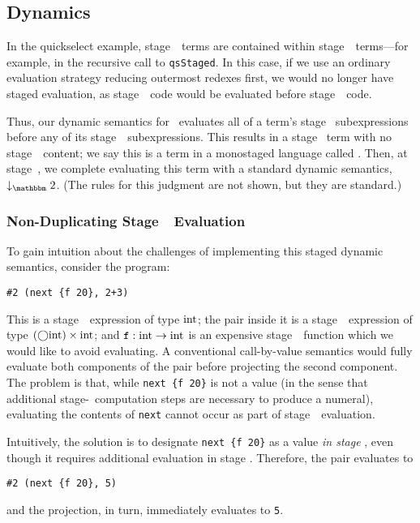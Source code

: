 \subsection{Dynamics}
\label{sec:stagedsemantics}

In the quickselect example, stage~\bbone\ terms are contained within
stage~\bbtwo\ terms---for example, in the recursive call to {\tt qsStaged}. In
this case, if we use an ordinary evaluation strategy reducing outermost redexes
first, we would no longer have staged evaluation, as stage~\bbtwo\ code would
be evaluated before stage~\bbone\ code. 

Thus, our dynamic semantics for \lang\ evaluates all of a term's stage \bbone\
subexpressions before any of its stage~\bbtwo\ subexpressions. This results in
a stage \bbtwo\ term with no stage~\bbone\ content; we say this is a term in a
monostaged language called \langTwo. Then, at stage~\bbtwo, we complete
evaluating this term with a standard dynamic semantics, $\tworedsym$. (The
rules for this judgment are not shown, but they are standard.)

\subsubsection{Non-Duplicating Stage~\bbone\ Evaluation}

To gain intuition about the challenges of implementing this staged dynamic
semantics, consider the program:
\begin{lstlisting}
#2 (next {f 20}, 2+3)
\end{lstlisting}
This is a stage~\bbone\ expression of type ${\rm int}$; the pair inside it is a
stage~\bbone\ expression of type $(\bigcirc{\rm int})\times{\rm int}$; and ${\tt f} :
{\rm int} \to {\rm int}$ is an expensive stage~\bbtwo\ function which we would like
to avoid evaluating. A conventional call-by-value semantics would fully
evaluate both components of the pair before projecting the second component.
The problem is that, while \verb|next {f 20}| is not a value (in the sense that
additional stage-\bbtwo\ computation steps are necessary to produce a numeral),
evaluating the contents of \verb|next| cannot occur as part of stage~\bbone\
evaluation.

Intuitively, the solution is to designate \verb|next {f 20}| as a value
\emph{in stage \bbone}, even though it requires additional evaluation in stage
\bbtwo. Therefore, the pair evaluates to
\begin{lstlisting}
#2 (next {f 20}, 5)
\end{lstlisting}
and the projection, in turn, immediately evaluates to \verb|5|.

